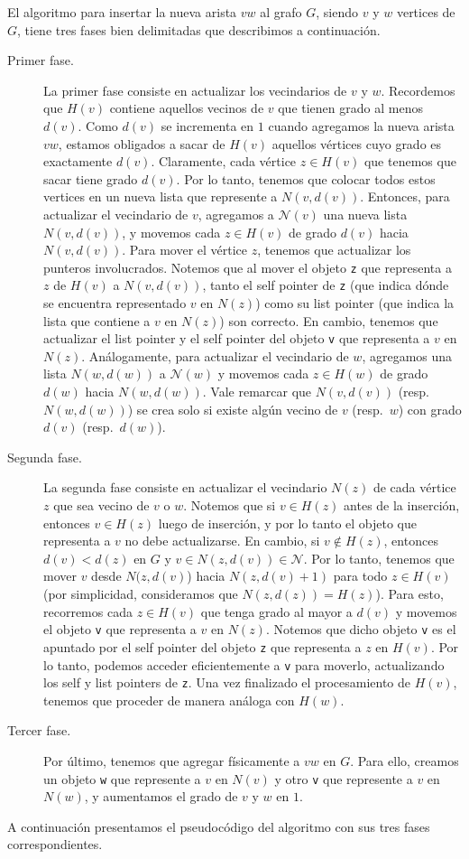\documentclass[a4paper,12pt]{article}
\newcommand{\N}{\mathcal{N}}
\begin{document}
El algoritmo para insertar la nueva arista $vw$ al grafo $G$, siendo $v$ y $w$ vertices de $G$, tiene tres fases bien delimitadas que describimos a continuación.
\begin{description}
\item [Primer fase.] La primer fase consiste en actualizar los vecindarios de $v$ y $w$.  Recordemos que $H(v)$ contiene aquellos vecinos de $v$ que tienen grado al menos $d(v)$.  Como $d(v)$ se incrementa en $1$ cuando agregamos la nueva arista $vw$, estamos obligados a sacar de $H(v)$ aquellos vértices cuyo grado es exactamente $d(v)$.  Claramente, cada vértice $z \in H(v)$ que tenemos que sacar tiene grado $d(v)$.  Por lo tanto, tenemos que colocar todos estos vertices en un nueva lista que represente a $N(v, d(v))$.  Entonces, para actualizar el vecindario de $v$,  agregamos a $\N(v)$ una nueva lista $N(v,d(v))$, y movemos cada $z \in H(v)$ de grado $d(v)$ hacia $N(v,d(v))$.  Para mover el vértice $z$, tenemos que actualizar los punteros involucrados.  Notemos que al mover el objeto \texttt{z} que representa a $z$ de $H(v)$ a $N(v, d(v))$, tanto el self pointer de \texttt{z} (que indica dónde se encuentra representado $v$ en $N(z)$) como su list pointer (que indica la lista que contiene a $v$ en $N(z)$) son correcto.  En cambio, tenemos que actualizar el list pointer y el self pointer del objeto \texttt{v} que representa a $v$ en $N(z)$.  Análogamente, para actualizar el vecindario de $w$, agregamos una lista $N(w, d(w))$ a $\N(w)$ y movemos cada $z \in H(w)$ de grado $d(w)$ hacia $N(w, d(w))$.  Vale remarcar que $N(v,d(v))$ (resp.\ $N(w, d(w))$) se crea solo si existe algún vecino de $v$ (resp.\ $w$) con grado $d(v)$ (resp.\ $d(w)$).  

\item [Segunda fase.]  La segunda fase consiste en actualizar el vecindario $N(z)$ de cada vértice $z$ que sea vecino de $v$ o $w$.  Notemos que si $v \in H(z)$ antes de la inserción, entonces $v \in H(z)$ luego de inserción, y por lo tanto el objeto que representa a $v$ no debe actualizarse.  En cambio, si $v \not\in H(z)$, entonces $d(v) < d(z)$ en $G$ y $v \in N(z, d(v)) \in \N$.  Por lo tanto, tenemos que mover $v$ desde $N(z,d(v)$) hacia $N(z, d(v)+1)$ para todo $z \in H(v)$ (por simplicidad, consideramos que $N(z, d(z)) = H(z)$).  Para esto, recorremos cada $z \in H(v)$ que tenga grado al mayor a $d(v)$ y movemos el objeto \texttt{v} que representa a $v$ en $N(z)$.  Notemos que dicho objeto \texttt{v} es el apuntado por el self pointer del objeto \texttt{z} que representa a $z$ en $H(v)$.  Por lo tanto, podemos acceder eficientemente a \texttt{v} para moverlo, actualizando los self y list pointers de \texttt{z}.  Una vez finalizado el procesamiento de $H(v)$, tenemos que proceder de manera análoga con $H(w)$.
%
\item [Tercer fase.] Por último, tenemos que agregar físicamente a $vw$ en $G$.  Para ello, creamos un objeto \texttt{w} que represente a $v$ en $N(v)$ y otro \texttt{v} que represente a $v$ en $N(w)$, y aumentamos el grado de $v$ y $w$ en $1$.
\end{description}
A continuación presentamos el pseudocódigo del algoritmo con sus tres fases correspondientes.
\end{document}
